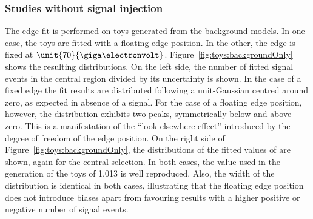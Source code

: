 \subsubsection{Studies without signal injection}
\label{sec:toysWO}
The edge fit is performed on toys generated from the background models. In one case, the toys are fitted with a floating edge position. In the other, the edge is fixed at $\unit{70}{\giga\electronvolt}$. Figure~\ref{fig:toys:backgroundOnly} shows the resulting distributions. On the left side, the number of fitted signal events in the central region divided by its uncertainty is shown. In the case of a fixed edge the fit results are distributed following a unit-Gaussian centred around zero, as expected in absence of a signal.  For the case of a floating edge position, however, the distribution exhibits two peaks, symmetrically below and above zero. This is a manifestation of the ``look-elsewhere-effect'' introduced by the degree of freedom of the edge position. On the right side of Figure~\ref{fig:toys:backgroundOnly}, the distributions of the fitted values of \Rsfof are shown, again for the central selection. In both cases, the value used in the generation of the toys of 1.013 is well reproduced. Also, the width of the distribution is identical in both cases,  illustrating that the floating edge position does not introduce biases apart from favouring results with a higher positive or negative number of signal events.

